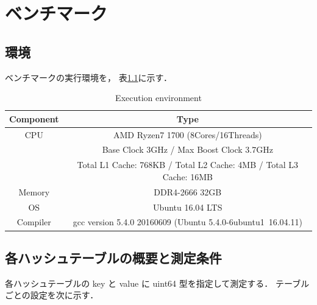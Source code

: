 \chapter{ベンチマーク}
\label{chap_Results}

\section{環境}

ベンチマークの実行環境を，
表\ref{table_env}に示す．

\begin{table}[hbtp]
  \label{table_env}
  \begin{center}
    \fontsize{9pt}{10pt}\selectfont
    \caption{Execution environment}
    \begin{tabular}{cc} \hline
      Component & Type                                                               \rule[0pt]{0pt}{10pt} \\ \hline
      CPU       & AMD Ryzen7 1700 (8Cores/16Threads)                                 \rule[0pt]{0pt}{10pt} \\ 
                & Base Clock 3GHz / Max Boost Clock 3.7GHz                           \rule[0pt]{0pt}{10pt} \\
                & Total L1 Cache: 768KB / Total L2 Cache: 4MB / Total L3 Cache: 16MB \rule[0pt]{0pt}{10pt} \\
      Memory    & DDR4-2666 32GB                                                     \rule[0pt]{0pt}{10pt} \\
      OS        & Ubuntu 16.04 LTS                                                   \rule[0pt]{0pt}{10pt} \\
      Compiler  & gcc version 5.4.0 20160609 (Ubuntu 5.4.0-6ubuntu1~16.04.11)        \rule[0pt]{0pt}{10pt} \\ \hline
    \end{tabular}
  \end{center}
\end{table}


\section{各ハッシュテーブルの概要と測定条件}
各ハッシュテーブルの key と value に uint64 型を指定して測定する．
テーブルごとの設定を次に示す．
\leavevmode \newline


